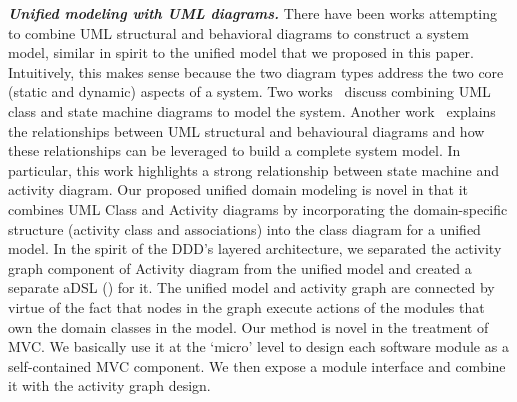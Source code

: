 \textbf{\textit{Unified modeling with UML diagrams.}}
There have been works attempting to combine UML structural and behavioral diagrams to construct a system model, similar in spirit to the unified model that we proposed in this paper. Intuitively, this makes sense because the two diagram types address the two core (static and dynamic) aspects of a system. Two works~\cite{kohler_integrating_2000, niaz_object-oriented_2005} discuss combining UML class and state machine diagrams to model the system. Another work~\cite{selonen_transformations_2003} explains the relationships between UML structural and behavioural diagrams and how these relationships can be leveraged to build a complete system model. In particular, this work highlights a strong relationship between state machine and activity diagram. 
%
Our proposed unified domain modeling is novel in that it combines UML Class and Activity diagrams by incorporating the domain-specific structure (activity class and associations) into the class diagram for a unified model. In the spirit of the DDD's layered architecture, we separated the activity graph component of Activity diagram from the unified model and created a separate aDSL (\agl) for it. The unified model and activity graph are connected by virtue of the fact that nodes in the graph execute actions of the modules that own the domain classes in the model.
%
%
Our method is novel in the treatment of MVC. We basically use it at the `micro' level to design each software module as a self-contained MVC component. We then expose a module interface and combine it with the activity graph design.

